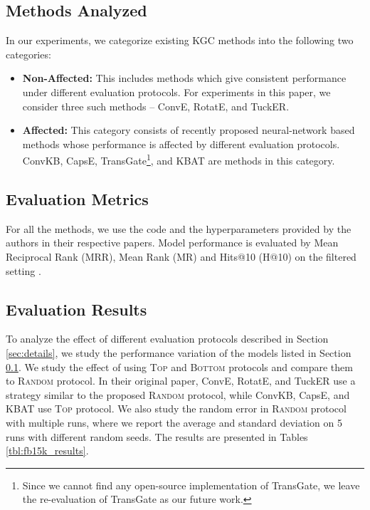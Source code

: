 \documentclass[11pt,a4paper]{article}
\begin{document}
\subsection{Methods Analyzed}
\label{sec:baselines}

In our experiments, we categorize existing KGC methods into the following two categories:

\begin{itemize}[itemsep=2pt,parsep=2pt,partopsep=0pt,leftmargin=*,topsep=4pt]
	\item \textbf{Non-Affected:} This includes methods which give consistent performance under different evaluation protocols. For experiments in this paper, we consider three such methods --
	ConvE, RotatE, and TuckER.
	\item \textbf{Affected:} This category consists of recently proposed neural-network based methods whose performance is affected by different evaluation protocols. ConvKB, CapsE, TransGate\footnote{Since we cannot find any open-source implementation of TransGate, we leave the re-evaluation of TransGate as our future work.}, and KBAT are methods in this category.
\end{itemize}




\subsection{Evaluation Metrics}
\label{sec:evaluation_metrics}

For all the methods, we use the code and the hyperparameters provided by the authors in their respective papers. 
Model performance is evaluated by Mean Reciprocal Rank (MRR), Mean Rank (MR) and Hits@10 (H@10) on the filtered setting \cite{transe}.
 \subsection{Evaluation Results}
\label{sec:results}








\label{sec:results_evaluation}
To analyze the effect of different evaluation protocols described in Section \ref{sec:details}, we study the performance variation of the models listed in Section \ref{sec:baselines}. We study the effect of using \textsc{Top} and \textsc{Bottom} protocols and compare them to \textsc{Random} protocol. In their original paper, ConvE, RotatE, and TuckER use a strategy similar to the proposed \textsc{Random} protocol, while ConvKB, CapsE, and KBAT use \textsc{Top} protocol. We also study the random error in \textsc{Random} protocol with multiple runs, where we report the average and standard deviation on 5 runs with different random seeds. The results are presented in Tables \ref{tbl:fb15k_results}.
\end{document}
